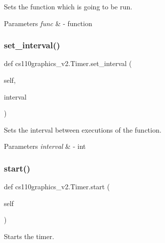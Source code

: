 Sets the function which is going to be run. 


\begin{DoxyParams}{Parameters}
{\em func} & -\/ function \\
\hline
\end{DoxyParams}
\mbox{\label{classcs110graphics__v2_1_1Timer_aca592991da63df981ee063c562e67ecc}} 
\subsubsection{\texorpdfstring{set\_interval()}{set\_interval()}}
{\footnotesize\ttfamily def cs110graphics\+\_\+v2.\+Timer.\+set\+\_\+interval (\begin{DoxyParamCaption}\item[{}]{self,  }\item[{}]{interval }\end{DoxyParamCaption})}



Sets the interval between executions of the function. 


\begin{DoxyParams}{Parameters}
{\em interval} & -\/ int \\
\hline
\end{DoxyParams}
\mbox{\label{classcs110graphics__v2_1_1Timer_aac77d9e79633fa405ce7ae0ed09c99fb}} 
\subsubsection{\texorpdfstring{start()}{start()}}
{\footnotesize\ttfamily def cs110graphics\+\_\+v2.\+Timer.\+start (\begin{DoxyParamCaption}\item[{}]{self }\end{DoxyParamCaption})}



Starts the timer. 

\mbox{\label{classcs110graphics__v2_1_1Timer_af622ebf43ed79a27f0ce0c5e6d316a62}} 
